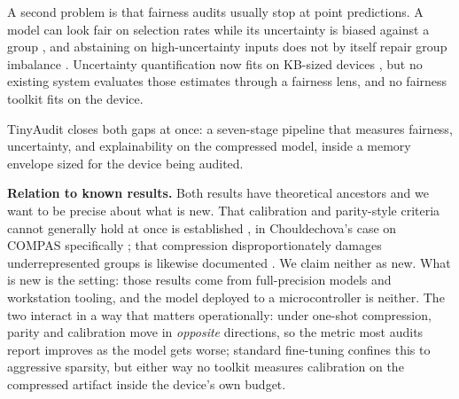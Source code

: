 \documentclass{article}
\begin{document}
A second problem is that fairness audits usually stop at point predictions. A model can look fair on selection rates while its uncertainty is biased against a group \cite{kuzucu2024}, and abstaining on high-uncertainty inputs does not by itself repair group imbalance \cite{rosenblatt2024}. Uncertainty quantification now fits on KB-sized devices \cite{ghanathe2025}, but no existing system evaluates those estimates through a fairness lens, and no fairness toolkit fits on the device.

TinyAudit closes both gaps at once: a seven-stage pipeline that measures fairness, uncertainty, and explainability on the compressed model, inside a memory envelope sized for the device being audited.

\textbf{Relation to known results.} Both results have theoretical ancestors and we want to be precise about what is new. That calibration and parity-style criteria cannot generally hold at once is established \cite{kleinberg2017,pleiss2017}, in Chouldechova's case on COMPAS specifically \cite{chouldechova2017}; that compression disproportionately damages underrepresented groups is likewise documented \cite{hooker2020,blakeney2021}. We claim neither as new. What is new is the setting: those results come from full-precision models and workstation tooling, and the model deployed to a microcontroller is neither. The two interact in a way that matters operationally: under one-shot compression, parity and calibration move in \emph{opposite} directions, so the metric most audits report improves as the model gets worse; standard fine-tuning confines this to aggressive sparsity, but either way no toolkit measures calibration on the compressed artifact inside the device's own budget.
\end{document}
